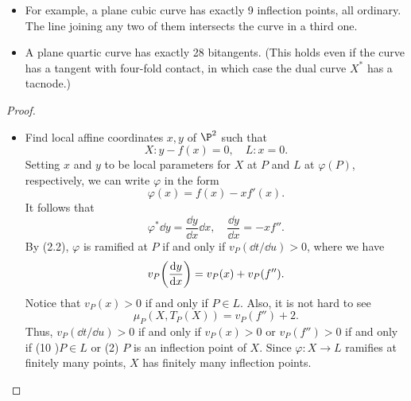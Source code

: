 \documentclass[a4paper]{article}
\begin{document}
\begin{enumerate} [label=\textbf{\arabic*.}, leftmargin=0em]
\begin{itemize}
          \item[(g)] For example, a plane cubic curve has exactly 9 inflection points, all ordinary.
                The line joining any two of them intersects the curve in a third one.

          \item[(h)] A plane quartic curve has exactly 28 bitangents.
                (This holds even if the curve has a tangent with four-fold contact, in which case the dual curve $X^*$ has a tacnode.)
        \end{itemize}

        \begin{proof} $ $ \vspace{0pt}
          \begin{itemize} [leftmargin=0cm]
            \item[(a)] Find local affine coordinates $x, y$ of $\P^2$ such that $$X : y - f(x) = 0, \quad L : x = 0.$$
                  Setting $x$ and $y$ to be local parameters for $X$ at $P$ and $L$ at $\varphi(P)$, respectively, we can write $\varphi$ in the form
                  \begin{equation*}
                    \varphi(x) = f(x) - xf'(x).
                  \end{equation*}
                  It follows that $$\varphi^* \dd y = \frac{\dd y}{\dd x} \dd x, \quad \frac{\dd y}{\dd x} = -xf''.$$
                  By (2.2), $\varphi$ is ramified at $P$ if and only if $v_P(\dd t / \dd u) > 0$, where we have
                  \begin{equation*}
                    v_P\bigg(\dv{y}{x}\bigg) = v_P(x) + v_P(f'').
                  \end{equation*}
                  Notice that $v_P(x) > 0$ if and only if $P \in L$.
                  Also, it is not hard to see
                  \begin{equation*}
                    \mu_P(X, T_P(X)) = v_P(f'') + 2.
                  \end{equation*}
                  Thus, $v_P(\dd t / \dd u) > 0$ if and only if $v_P(x) > 0$ or $v_P(f'') > 0$ if and only if (10 )$P \in L$ or (2) $P$ is an inflection point of $X$.
                  Since $\varphi : X \to L$ ramifies at finitely many points, $X$ has finitely many inflection points.


\end{itemize}
\end{proof}
\end{enumerate}
\end{document}
